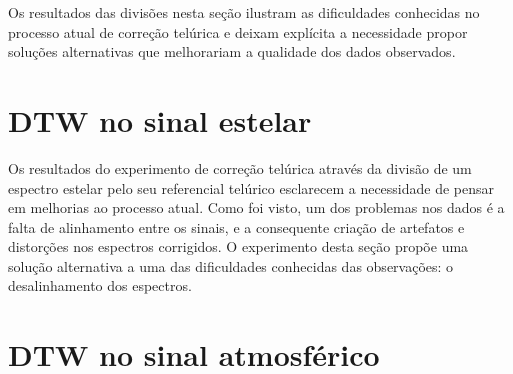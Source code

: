 Os resultados das divisões nesta seção ilustram as dificuldades conhecidas no processo atual de correção telúrica e deixam explícita a necessidade propor soluções alternativas que melhorariam a qualidade dos dados observados.

\section{DTW no sinal estelar}

Os resultados do experimento de correção telúrica através da divisão de um espectro estelar pelo seu referencial telúrico esclarecem a necessidade de pensar em melhorias ao processo atual. Como foi visto, um dos problemas nos dados é a falta de alinhamento entre os sinais, e a consequente criação de artefatos e distorções nos espectros corrigidos. O experimento desta seção propõe uma solução alternativa a uma das dificuldades conhecidas das observações: o desalinhamento dos espectros.




\section{DTW no sinal atmosférico}